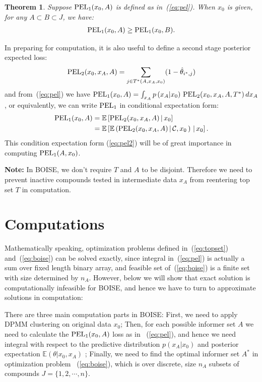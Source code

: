 \documentclass[12pt]{article}
\newtheorem{theorem}{Theorem}
\begin{document}
\begin{theorem}
Suppose ${\mbox {\rm PEL}}_1(x_0,A)$ is defined as in~(\ref{eq:pel}). When $x_0$ is given, for any $A\subset B\subset J$, we have:
\begin{eqnarray*}
{\mbox {\rm PEL}}_1(x_0,A) \geq {\mbox {\rm PEL}}_1(x_0,B).
\end{eqnarray*}

\end{theorem}

In preparing for computation, it is also useful to define a second stage
posterior expected loss:
\begin{eqnarray*}
{\mbox {\rm PEL}}_2(x_0,x_A,A) =  \sum_{j \in  T^*(A,x_A,x_0)} ( 1 - \hat \theta_{i^*,j} )
\end{eqnarray*}
and from~(\ref{eq:pel}) we have ${\mbox {\rm PEL}}_1(x_0,A) = \int_{x_{ A}} p\left( x_{A} | x_0 \right) \,
{\mbox {\rm PEL}}_2(x_0,x_A,A,T^*) \, dx_{ A} 
$, or equivalently, we can write ${\mbox {\rm PEL}}_1$ in conditional expectation form:
\begin{align}
\nonumber
{\mbox {\rm PEL}}_1(x_0,A) &= \mathbb E\left[ {\mbox {\rm PEL}}_2(x_0,x_A,A) \, |\, x_0\right]\\
\label{eq:pel2}
&= \mathbb E\left[ \mathbb E\left({\mbox {\rm PEL}}_2(x_0,x_A,A)\, | \, \mathcal{C},x_0\,\right) \, |\, x_0\right].
\end{align}
This condition expectation form (\ref{eq:pel2}) will be of great importance in computing ${\mbox {\rm PEL}}_1(A,x_0)$. 

\textbf{Note:} In BOISE, we don't require $T$ and $A$ to be disjoint. Therefore we need to prevent inactive compounds tested in intermediate data $x_A$ from reentering top set $T$ in computation.

\section{Computations}
Mathematically speaking, optimization problems defined in~(\ref{eq:topset}) and~(\ref{eq:boise}) can be solved exactly, since integral in~(\ref{eq:pel}) is actually a sum over fixed length binary array, and feasible set of~(\ref{eq:boise}) is a finite set with size determined by $n_A$. However, below we will show that exact solution is computationally infeasible for BOISE, and hence we have to turn to approximate solutions in computation:

There are three main computation parts in BOISE: First, we need to apply DPMM clustering on original data $x_0$; Then, for each possible informer set $A$ we need to calculate the ${\rm PEL}_1(x_0,A)$ loss as in  ~(\ref{eq:pel}), and hence we need integral with respect to the predictive distribution $p(x_A|x_0)$
and posterior expectation
$\mathbb E(\theta|x_0,x_A)$ ; Finally, we need to find the optimal informer set $A^*$ in optimization problem ~(\ref{eq:boise}), which is over 
discrete, size $n_A$ subsets of compounds $J=\{1,2, \cdots, n\}$.  
\end{document}
